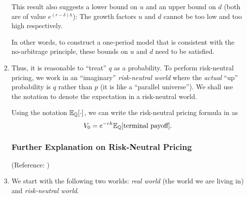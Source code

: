 \begin{enumerate}
\begin{note}
This result also suggests a lower bound on \(u\) and an upper bound on \(d\)
(both are of value \(e^{(r-\delta)h}\)): The growth factors \(u\) and \(d\)
cannot be too low and too high respectively.

In other words, to construct a one-period model that is consistent with the
no-arbitrage principle, these bounds on \(u\) and \(d\) need to be satisfied.
 \end{note}
\item \label{it:rn-pricing-fmla}
Thus, it is reasonable to ``treat'' \(q\) as a probability. To perform
risk-neutral pricing, we work in an ``imaginary'' \emph{risk-neutral world}
where the \emph{actual} ``up'' probability is \(q\) rather than \(p\) (it is
like a ``parallel universe''). We shall use the notation
 to denote the expectation in a risk-neutral world.


Using the notation \(\mathbb{E}_{\mathbb{Q}}\qty[\cdot]\), we can write the risk-neutral pricing
formula in  as
\[
V_0=e^{-rh}\mathbb{E}_{\mathbb{Q}}\qty[\text{terminal payoff}].
\]
\subsubsection*{Further Explanation on Risk-Neutral Pricing}
(Reference: \textcite[Section~4.1.2]{lo2018derivative})

\item We start with the following two worlds: \emph{real world} (the world we
are living in) and \emph{risk-neutral world}.
\begin{center}

\end{center}


\end{enumerate}
